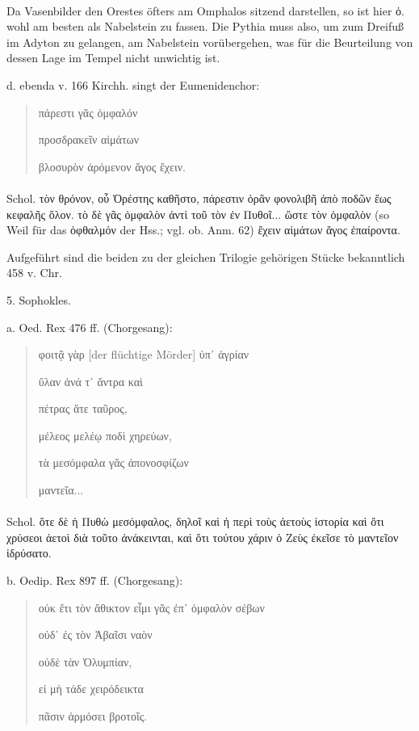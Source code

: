 \documentclass[a4paper, 11pt, oneside]{article}
\begin{document}
\paragraph{} 
Da Vasenbilder den Orestes öfters am Omphalos sitzend darstellen, so ist hier ὀ. wohl am besten als Nabelstein zu fassen. Die Pythia muss also, um zum Dreifuß im Adyton zu gelangen, am Nabelstein vorübergehen, was für die Beurteilung von dessen Lage im Tempel nicht unwichtig ist.

d. ebenda v. 166 Kirchh. singt der Eumenidenchor:
\begin{quotation}
πάρεστι γᾶς ὀμφαλόν

προσδρακεῖν αἰμάτων

βλοσυρὸν ἀρόμενον ἄγος ἔχειν.
\end{quotation}
\paragraph{}
Schol. τὸν θρόνον, οὗ Ὀρέστης καθῆστο, πάρεστιν ὁρᾶν φονολιβῆ ἀπὸ ποδῶν ἕως κεφαλῆς ὅλον. τὸ δὲ γᾶς ὀμφαλὸν ἀντὶ τοῦ τὸν ἐν Πυθοῖ... ὥστε τὸν ὀμφαλὸν (so Weil für das ὀφθαλμόν der Hss.; vgl. ob. Anm. 62) ἔχειν αἱμάτων ἄγος ἐπαίροντα.

Aufgeführt sind die beiden zu der gleichen Trilogie gehörigen Stücke bekanntlich 458 v. Chr.

5. Sophokles.

a. Oed. Rex 476 ff. (Chorgesang):
\begin{quotation}
φοιτᾷ γὰρ [der flüchtige Mörder] ὑπ᾽ ἀγρίαν

ὕλαν ἀνά τ᾽ ἄντρα καὶ

πέτρας ἅτε ταῦρος,

μέλεος μελέῳ ποδὶ χηρεύων,

τὰ μεσόμφαλα γᾶς ἀπονοσφίζων

μαντεῖα...
\end{quotation}
\paragraph{}
Schol. ὅτε δὲ ἡ Πυθὼ μεσόμφαλος, δηλοῖ καὶ ἡ περὶ τοὺς ἀετοὺς ἱστορία καὶ ὅτι χρύσεοι ἀετοὶ διὰ τοῦτο ἀνάκεινται, καὶ ὅτι τούτου χάριν ὁ Ζεὺς ἐκεῖσε τὸ μαντεῖον ἱδρύσατο.

b. Oedip. Rex 897 ff. (Chorgesang):
\begin{quotation}
οὐκ ἔτι τὸν ἄθικτον εἶμι γᾶς ἐπ᾿ ὀμφαλὸν σέβων

οὐδ᾽ ἐς τὸν Ἀβαῖσι ναὸν

οὐδὲ τὰν Ὀλυμπίαν,

εἰ μὴ τάδε χειρόδεικτα

πᾶσιν ἁρμόσει βροτοῖς.
\end{quotation}
\end{document}
